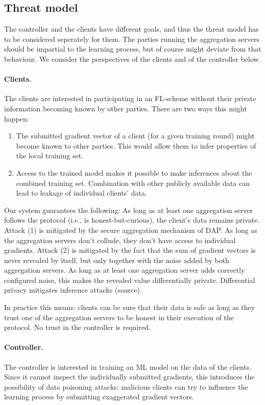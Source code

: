 \documentclass{article}
\begin{document}
\subsection{Threat model}
The controller and the clients have different goals, and thus the threat model
has to be considered seperately for them. The parties running the aggregation
servers should be impartial to the learning process, but of course might deviate
from that behaviour. We consider the perspectives of the clients
and of the controller below.

\paragraph{Clients.} The clients are interested in participating in an FL-scheme
without their private information becoming known by other parties. There are two
ways this might happen:
\begin{enumerate}
\item The submitted gradient vector of a client (for a given training round) might
  become known to other parties. This would allow them to infer properties of
  the local training set.
\item Access to the trained model makes it possible to make inferences about the
  combined training set. Combination with other publicly available data can lead to
  leakage of individual clients' data.
\end{enumerate}
Our system guarantees the following: As long as at least one aggregation server
follows the protocol (i.e., is honest-but-curious), the client's data remains
private. Attack (1) is mitigated by the secure aggregation mechanism of DAP.
As long as the aggregation servers don't collude, they don't have access to
individual gradients. Attack (2) is mitigated by the fact that the sum of
gradient vectors is never revealed by itself, but only together with the noise added by
both aggregation servers. As long as at least one aggregation server adds
correctly configured noise, this makes the revealed value differentially
private. Differential privacy mitigates inference attacks (source).

In practice this means: clients can be sure that their data is safe as long as
they trust one of the aggregation servers to be honest in their execution of the
protocol. No trust in the controller is required.

\paragraph{Controller.} The controller is interested in training an ML model on
the data of the clients. Since it cannot inspect the individually submitted
gradients, this introduces the possibility of data poisoning attacks: malicious
clients can try to influence the learning process by submitting exaggerated
gradient vectors.
\end{document}
